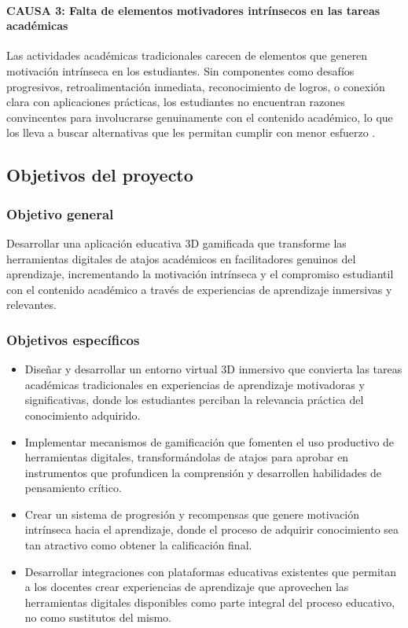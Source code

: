 \paragraph{CAUSA 3: Falta de elementos motivadores intrínsecos en las tareas académicas}
Las actividades académicas tradicionales carecen de elementos que generen motivación intrínseca en los estudiantes. Sin componentes como desafíos progresivos, retroalimentación inmediata, reconocimiento de logros, o conexión clara con aplicaciones prácticas, los estudiantes no encuentran razones convincentes para involucrarse genuinamente con el contenido académico, lo que los lleva a buscar alternativas que les permitan cumplir con menor esfuerzo \cite{sappaile2024}.

\subsection{Objetivos del proyecto}

\subsubsection{Objetivo general}

Desarrollar una aplicación educativa 3D gamificada que transforme las herramientas digitales de atajos académicos en facilitadores genuinos del aprendizaje, incrementando la motivación intrínseca y el compromiso estudiantil con el contenido académico a través de experiencias de aprendizaje inmersivas y relevantes.

\subsubsection{Objetivos específicos}

\begin{itemize}
\item Diseñar y desarrollar un entorno virtual 3D inmersivo que convierta las tareas académicas tradicionales en experiencias de aprendizaje motivadoras y significativas, donde los estudiantes perciban la relevancia práctica del conocimiento adquirido.
\item Implementar mecanismos de gamificación que fomenten el uso productivo de herramientas digitales, transformándolas de atajos para aprobar en instrumentos que profundicen la comprensión y desarrollen habilidades de pensamiento crítico.
\item Crear un sistema de progresión y recompensas que genere motivación intrínseca hacia el aprendizaje, donde el proceso de adquirir conocimiento sea tan atractivo como obtener la calificación final.
\item Desarrollar integraciones con plataformas educativas existentes que permitan a los docentes crear experiencias de aprendizaje que aprovechen las herramientas digitales disponibles como parte integral del proceso educativo, no como sustitutos del mismo.
\end{itemize}

